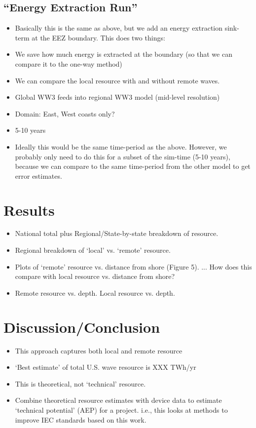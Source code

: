 \documentclass[authoryear,preprint]{elsarticle}
\begin{document}
\subsection{``Energy Extraction Run''}

\begin{itemize}
\item Basically this is the same as above, but we add an energy extraction sink-term at the EEZ boundary. This does two things:
\item We save how much energy is extracted at the boundary (so that we can compare it to the one-way method)
\item We can compare the local resource with and without remote waves.
\item Global WW3 feeds into regional WW3 model (mid-level resolution)
\item Domain: East, West coasts only?
\item 5-10 years
\item Ideally this would be the same time-period as the above. However, we probably only need to do this for a subset of the sim-time (5-10 years), because we can compare to the same time-period from the other model to get error estimates.
\end{itemize}


\section{Results}
\begin{itemize}
\item National total plus Regional/State-by-state breakdown of resource.
\item Regional breakdown of ‘local’ vs. ‘remote’ resource.
\item Plots of ‘remote’ resource vs. distance from shore (Figure 5). ... How does this compare with local resource vs. distance from shore?
\item Remote resource vs. depth. Local resource vs. depth.
\end{itemize}

\section{Discussion/Conclusion}

\begin{itemize}
\item This approach captures both local and remote resource
\item ‘Best estimate’ of total U.S. wave resource is XXX TWh/yr
\item This is theoretical, not ‘technical’ resource.
\item Combine theoretical resource estimates with device data to estimate ‘technical potential’ (AEP) for a project. i.e., this looks at methods to improve IEC standards based on this work.
\end{itemize}

\clearpage



\end{document}
